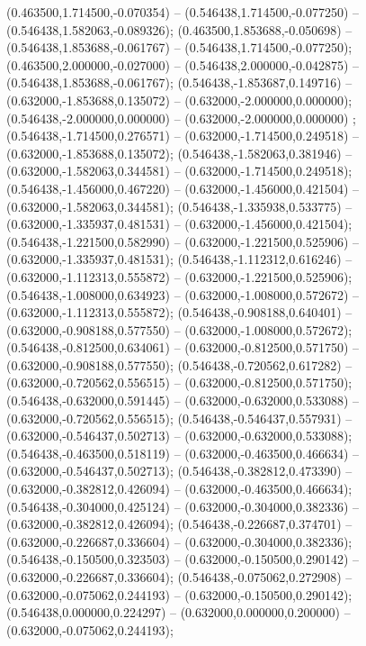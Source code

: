  (0.463500,1.714500,-0.070354) -- (0.546438,1.714500,-0.077250) -- (0.546438,1.582063,-0.089326);
 (0.463500,1.853688,-0.050698) -- (0.546438,1.853688,-0.061767) -- (0.546438,1.714500,-0.077250);
 (0.463500,2.000000,-0.027000) -- (0.546438,2.000000,-0.042875) -- (0.546438,1.853688,-0.061767);
 (0.546438,-1.853687,0.149716) -- (0.632000,-1.853688,0.135072) -- (0.632000,-2.000000,0.000000);
 (0.546438,-2.000000,0.000000) -- (0.632000,-2.000000,0.000000) ;
 (0.546438,-1.714500,0.276571) -- (0.632000,-1.714500,0.249518) -- (0.632000,-1.853688,0.135072);
 (0.546438,-1.582063,0.381946) -- (0.632000,-1.582063,0.344581) -- (0.632000,-1.714500,0.249518);
 (0.546438,-1.456000,0.467220) -- (0.632000,-1.456000,0.421504) -- (0.632000,-1.582063,0.344581);
 (0.546438,-1.335938,0.533775) -- (0.632000,-1.335937,0.481531) -- (0.632000,-1.456000,0.421504);
 (0.546438,-1.221500,0.582990) -- (0.632000,-1.221500,0.525906) -- (0.632000,-1.335937,0.481531);
 (0.546438,-1.112312,0.616246) -- (0.632000,-1.112313,0.555872) -- (0.632000,-1.221500,0.525906);
 (0.546438,-1.008000,0.634923) -- (0.632000,-1.008000,0.572672) -- (0.632000,-1.112313,0.555872);
 (0.546438,-0.908188,0.640401) -- (0.632000,-0.908188,0.577550) -- (0.632000,-1.008000,0.572672);
 (0.546438,-0.812500,0.634061) -- (0.632000,-0.812500,0.571750) -- (0.632000,-0.908188,0.577550);
 (0.546438,-0.720562,0.617282) -- (0.632000,-0.720562,0.556515) -- (0.632000,-0.812500,0.571750);
 (0.546438,-0.632000,0.591445) -- (0.632000,-0.632000,0.533088) -- (0.632000,-0.720562,0.556515);
 (0.546438,-0.546437,0.557931) -- (0.632000,-0.546437,0.502713) -- (0.632000,-0.632000,0.533088);
 (0.546438,-0.463500,0.518119) -- (0.632000,-0.463500,0.466634) -- (0.632000,-0.546437,0.502713);
 (0.546438,-0.382812,0.473390) -- (0.632000,-0.382812,0.426094) -- (0.632000,-0.463500,0.466634);
 (0.546438,-0.304000,0.425124) -- (0.632000,-0.304000,0.382336) -- (0.632000,-0.382812,0.426094);
 (0.546438,-0.226687,0.374701) -- (0.632000,-0.226687,0.336604) -- (0.632000,-0.304000,0.382336);
 (0.546438,-0.150500,0.323503) -- (0.632000,-0.150500,0.290142) -- (0.632000,-0.226687,0.336604);
 (0.546438,-0.075062,0.272908) -- (0.632000,-0.075062,0.244193) -- (0.632000,-0.150500,0.290142);
 (0.546438,0.000000,0.224297) -- (0.632000,0.000000,0.200000) -- (0.632000,-0.075062,0.244193);
